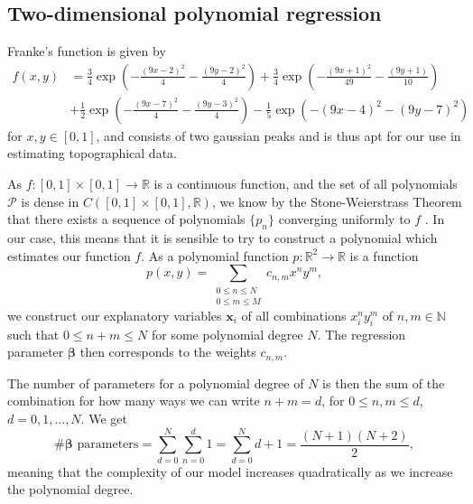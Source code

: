 \documentclass{article}
\begin{document}
\subsection{Two-dimensional polynomial regression}
Franke's function is given by
\begin{equation*}
    \begin{split}
        f(x,y) & = \frac{3}{4}\exp\left(-\frac{(9x-2)^2}{4} - \frac{(9y-2)^2}{4}\right) + \frac{3}{4}\exp\left(-\frac{(9x+1)^2}{49} - \frac{(9y+1)}{10}\right) \\
        & + \frac{1}{2}\exp\left(-\frac{(9x-7)^2}{4} - \frac{(9y-3)^2}{4}\right) - \frac{1}{5}\exp\left(-(9x-4)^2 - (9y-7)^2\right)
    \end{split}
\end{equation*}
for $x, y \in [0, 1]$, and consists of two gaussian peaks and is thus apt for our use in estimating topographical data.

As $f: [0,1] \times [0, 1] \to \mathbb{R}$ is a continuous function, and the set of all polynomials $\mathcal{P}$ is dense in $C([0,1] \times [0,1], \mathbb{R})$, we know by the Stone-Weierstrass Theorem that there exists a sequence of polynomials $\{p_n\}$ converging uniformly to $f$ \cite[p.~116--129]{lindstrom2017spaces}. In our case, this means that it is sensible to try to construct a polynomial which estimates our function $f$. As a polynomial function $p: \mathbb{R}^2 \to \mathbb{R}$ is a function
\begin{equation*}
    p(x,y) = \sum_{\substack{0 \leq n \leq N \\ 0 \leq m \leq M}} c_{n,m} x^n y^m,
\end{equation*}
we construct our explanatory variables $\boldsymbol{x}_i$ of all combinations $x_i^n y_i^m$ of $n,m \in \mathbb{N}$ such that $0 \leq n + m \leq N$ for some polynomial degree $N$. The regression parameter $\boldsymbol{\beta}$ then corresponds to the weights $c_{n,m}$.

The number of parameters for a polynomial degree of $N$ is then the sum of the combination for how many ways we can write $n+m = d$, for $0\leq n,m \leq d$, $d = 0, 1, \ldots, N$. We get
\begin{equation*}
    \text{\# $\boldsymbol{\beta}$ parameters} = \sum_{d = 0}^N \sum_{n = 0}^d 1
    = \sum_{d = 0}^N d + 1
    = \frac{(N + 1)(N + 2)}{2},
\end{equation*}
meaning that the complexity of our model increases quadratically as we increase the polynomial degree.
\end{document}
